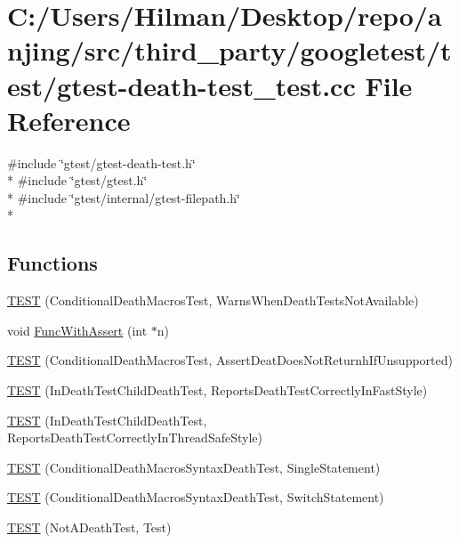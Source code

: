 \hypertarget{gtest-death-test__test_8cc}{}\section{C\+:/\+Users/\+Hilman/\+Desktop/repo/anjing/src/third\+\_\+party/googletest/test/gtest-\/death-\/test\+\_\+test.cc File Reference}
\label{gtest-death-test__test_8cc}
{\ttfamily \#include \char`\"{}gtest/gtest-\/death-\/test.\+h\char`\"{}}\\*
{\ttfamily \#include \char`\"{}gtest/gtest.\+h\char`\"{}}\\*
{\ttfamily \#include \char`\"{}gtest/internal/gtest-\/filepath.\+h\char`\"{}}\\*
\subsection*{Functions}
\begin{DoxyCompactItemize}
\item 
\hyperlink{gtest-death-test__test_8cc_a8a47cdbd11c2456db464fe098d134aa0}{T\+E\+S\+T} (Conditional\+Death\+Macros\+Test, Warns\+When\+Death\+Tests\+Not\+Available)
\item 
void \hyperlink{gtest-death-test__test_8cc_afe40addf0e0bb4657d18f512092ef03b}{Func\+With\+Assert} (int $\ast$n)
\item 
\hyperlink{gtest-death-test__test_8cc_acdbff3626995270fcbcc0b97e303d742}{T\+E\+S\+T} (Conditional\+Death\+Macros\+Test, Assert\+Deat\+Does\+Not\+Returnh\+If\+Unsupported)
\item 
\hyperlink{gtest-death-test__test_8cc_a46e4e7a2114c1b71021090b40feaae84}{T\+E\+S\+T} (In\+Death\+Test\+Child\+Death\+Test, Reports\+Death\+Test\+Correctly\+In\+Fast\+Style)
\item 
\hyperlink{gtest-death-test__test_8cc_a12fcd5ad260a91ba26a4cc85293bae7a}{T\+E\+S\+T} (In\+Death\+Test\+Child\+Death\+Test, Reports\+Death\+Test\+Correctly\+In\+Thread\+Safe\+Style)
\item 
\hyperlink{gtest-death-test__test_8cc_aacb04a80e0263de84b203b95cc421437}{T\+E\+S\+T} (Conditional\+Death\+Macros\+Syntax\+Death\+Test, Single\+Statement)
\item 
\hyperlink{gtest-death-test__test_8cc_a8d27f7b1efa4db83935274467e17f40c}{T\+E\+S\+T} (Conditional\+Death\+Macros\+Syntax\+Death\+Test, Switch\+Statement)
\item 
\hyperlink{gtest-death-test__test_8cc_af77aa369d8ed7d7ceefda4e7b073b05a}{T\+E\+S\+T} (Not\+A\+Death\+Test, Test)
\end{DoxyCompactItemize}


